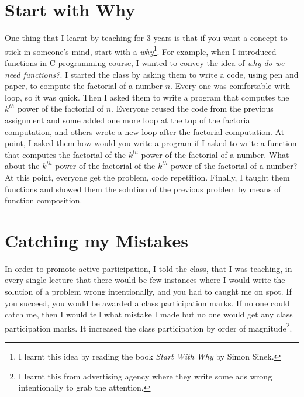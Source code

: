 \documentclass[a4paper]{article}
\begin{document}
\section{Start with Why}
One thing that I learnt by teaching for 3 years is that if you want a concept 
to stick in someone's mind, start with a \textit{why}\footnote{I learnt this idea by reading the book 
\textit{Start With Why} by Simon Sinek.}. For example, when I introduced functions 
in C programming course, I wanted to convey the idea of \textit{why do we need functions?}. I started the class by 
asking them to write a code, using pen and paper, to compute the factorial of a number $n$. 
Every one was comfortable with loop, so it was quick. Then I asked them to write a program that 
computes the $k^{th}$ power of the factorial of $n$. Everyone reused the code from 
the previous assignment and some added one more loop at the top of the factorial 
computation, and others wrote a new loop after the factorial computation. 
At point, I asked them how would you write a program if I asked to write 
a function that computes the factorial of the $k^{th}$ power of the factorial of a number. 
What about the $k^{th}$ power of the factorial of the $k^{th}$ power of the factorial of a number? 
At this point, everyone get the problem, code repetition. Finally, I taught them functions 
and showed them the solution of the previous problem by means of function composition. 

\section{Catching my Mistakes}
In order to promote active participation, I told the class, that I was teaching, in every single lecture that there would be 
few instances where I would write the solution of a problem wrong intentionally, and you had to 
caught me on spot. If you succeed, you would be awarded a class participation marks. If no one could catch me, 
then I would tell what mistake I made but no one would get any class participation marks. It increased the class 
participation by order of magnitude\footnote{I learnt this from advertising agency where they write some ads wrong 
intentionally to grab the attention.}. 
\end{document}

